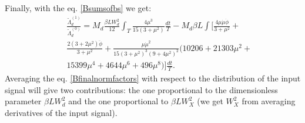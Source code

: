 \documentclass{article}
\begin{document}
Finally, with the eq$.$ \eqref{Bsumsofbs} we get:
\begin{eqnarray}\label{Bfinalnormfactors}
    &&\frac{\tilde{\Lambda}_{d}^{(1)}}{\tilde{\Lambda}_{d}^{(0)}} = M_{d}\frac{\beta L W_{d}^{2}}{12} \int_{T} \frac{4 \mu^{3}}{15(3+\mu^{2})} \frac{dt}{T} - M_{d} \beta L \int  \Bigg[\frac{4\mu\dot{\mu}\dot{\phi}}{3+\mu^{2}} +\nonumber\\
    && \frac{2(3+2\mu^{2})\ddot{\phi}}{3+\mu^{2}} + \frac{\mu\dot{\mu}^{2}}{15(3+\mu^{2})^{3}(9+4\mu^{2})^{2}}(10206 + 21303\mu^{2} +\nonumber \\
    &&15399\mu^{4}+4644\mu^{6} +496\mu^{8})\Bigg]\frac{dt}{T}.
\end{eqnarray}
Averaging the eq$.$ \eqref{Bfinalnormfactors} with respect to the distribution of the input signal will give two contributions: the one proportional to the dimensionless parameter $\beta L W_{d}^{2}$ and the one proportional to $\beta L W_{X}^{2}$ (we get $W_{X}^{2}$ from averaging derivatives of the input signal).
\end{document}
